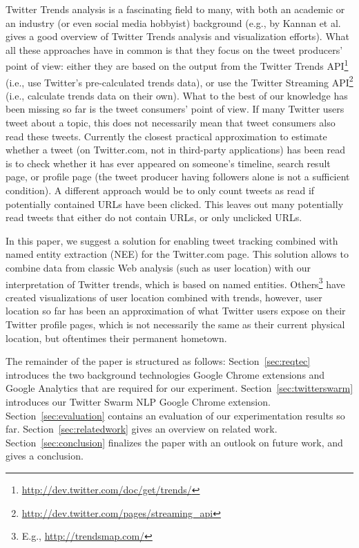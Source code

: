 \documentclass[runningheads,a4paper]{llncs}
\begin{document}
Twitter Trends analysis is a fascinating field to many, with both an academic or an industry (or even social media hobbyist) background (e.g., \cite{Kannan:Trendtracker} by Kannan et al. gives a good overview of Twitter Trends analysis and visualization efforts). What all these approaches have in common is that they focus on the tweet producers' point of view: either they are based on the output from the Twitter Trends API\footnote{\url{http://dev.twitter.com/doc/get/trends/}} (i.e., use Twitter's pre-calculated trends data), or use the Twitter Streaming API\footnote{\url{http://dev.twitter.com/pages/streaming_api}} (i.e., calculate trends data on their own). What to the best of our knowledge has been missing so far is the tweet consumers' point of view. If many Twitter users tweet about a topic, this does not necessarily mean that tweet consumers also read these tweets. Currently the closest practical approximation to estimate whether a tweet (on Twitter.com, not in third-party applications) has been read is to check whether it has ever appeared on someone's timeline, search result page, or profile page (the tweet producer having followers alone is not a sufficient condition). A different approach would be to only count tweets as read if potentially contained URLs have been clicked. This leaves out many potentially read tweets that either do not contain URLs, or only unclicked URLs.

In this paper, we suggest a solution for enabling tweet tracking combined with named entity extraction (NEE) for the Twitter.com page. This solution allows to combine data from classic Web analysis (such as user location) with our interpretation of Twitter trends, which is based on named entities. Others\footnote{E.g., \url{http://trendsmap.com/}} have created visualizations of user location combined with trends, however, user location so far has been an approximation of what Twitter users expose on their Twitter profile pages, which is not necessarily the same as their current physical location, but oftentimes their permanent hometown. 

The remainder of the paper is structured as follows: Section~\ref{sec:reqtec} introduces the two background technologies Google Chrome extensions and Google Analytics that are required for our experiment. Section~\ref{sec:twitterswarm} introduces our Twitter Swarm NLP Google Chrome extension. Section~\ref{sec:evaluation} contains an evaluation of our experimentation results so far. Section~\ref{sec:relatedwork} gives an overview on related work. Section~\ref{sec:conclusion} finalizes the paper with an outlook on future work, and gives a conclusion.
\end{document}
